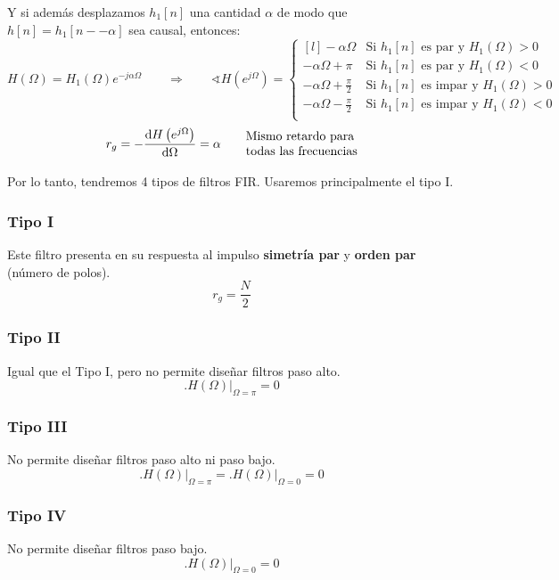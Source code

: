 \documentclass[a4paper,oneside]{book}
\begin{document}
Y si además desplazamos $h_1[n]$ una cantidad $\alpha$ de modo que $h[n] = h_1[n--\alpha ]$ sea causal, entonces:
\[ H(\Omega ) = H_1(\Omega )e^{-j\alpha \Omega} \qquad \Longrightarrow \qquad  \sphericalangle H \left( e^{j\Omega} \right) = \left\lbrace 
\begin{matrix*}[l]
	-\alpha \Omega & \text{Si } h_1[n] \text{ es par y } H_1(\Omega ) > 0\\
	-\alpha \Omega + \pi & \text{Si } h_1[n] \text{ es par y } H_1(\Omega ) < 0\\
	-\alpha \Omega + \frac{\pi}{2} & \text{Si } h_1[n] \text{ es impar y } H_1(\Omega ) > 0\\
	-\alpha \Omega - \frac{\pi}{2} & \text{Si } h_1[n] \text{ es impar y } H_1(\Omega ) < 0\\
\end{matrix*} \right. \]
\renewcommand{\arraystretch}{1}
\[ r_g = -\dv{H \left( e^{j\Omega} \right)}{\Omega} = \alpha \qquad 
\begin{matrix*}[l]
	\text{Mismo retardo para}\\
	\text{todas las frecuencias}
\end{matrix*} \]
\renewcommand{\arraystretch}{1.5}

Por lo tanto, tendremos 4 tipos de filtros FIR. Usaremos principalmente el tipo I.

\begin{multicols}{2}
	\subsubsection{Tipo I}
	Este filtro presenta en su respuesta al impulso \textbf{simetría par} y \textbf{orden par} (número de polos).
	\[ r_g = \frac{N}{2} \]

	\subsubsection{Tipo II}
	Igual que el Tipo I, pero no permite diseñar filtros paso alto.
	\[ \biggl. H(\Omega ) \biggr\vert _{\Omega = \pi} = 0 \]

\end{multicols}
\begin{multicols}{2}

	\subsubsection{Tipo III}
	No permite diseñar filtros paso alto ni paso bajo.
	\[ \biggl. H(\Omega ) \biggr\vert _{\Omega = \pi} = \biggl. H(\Omega ) \biggr\vert _{\Omega = 0} = 0  \]

	\subsubsection{Tipo IV}
	No permite diseñar filtros paso bajo.
	\[ \biggl. H(\Omega ) \biggr\vert _{\Omega = 0} = 0 \]
\end{multicols}
\end{document}
